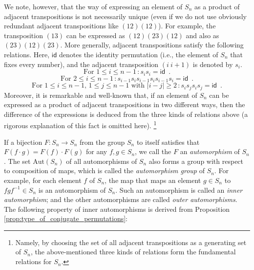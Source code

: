 \documentclass[11pt]{article}
\begin{document}
We note, however, that the way of expressing an element of $S_n$ as a product of adjacent transpositions is not necessarily unique (even if we do not use obviously redundant adjacent transpositions like $(12)(12)$).
For example, the transposition $(13)$ can be expressed as $(12)(23)(12)$ and also as $(23)(12)(23)$.
More generally, adjacent transpositions satisfy the following relations.
Here, $\mathsf{id}$ denotes the identity permutation (i.e., the element of $S_n$ that fixes every number), and the adjacent transposition $(i\ i+1)$ is denoted by $s_i$.
\begin{equation}
\label{eq:relation_each_generator}
\mbox{For } 1 \leq i \leq n-1\,: s_i s_i = \mathsf{id} \enspace.
\end{equation}
\begin{equation}
\label{eq:relation_adjacent_generators}
\mbox{For } 2 \leq i \leq n-1\,: s_{i-1} s_i s_{i-1} s_i s_{i-1} s_i = \mathsf{id} \enspace.
\end{equation}
\begin{equation}
\label{eq:relation_non-adjacent_generators}
\mbox{For } 1 \leq i \leq n-1,\,1 \leq j \leq n-1 \mbox{ with } |i-j| \geq 2\,: s_i s_j s_i s_j = \mathsf{id} \enspace.
\end{equation}
Moreover, it is remarkable and well-known that, if an element of $S_n$ can be expressed as a product of adjacent transpositions in two different ways, then the difference of the expressions is deduced from the three kinds of relations above (a rigorous explanation of this fact is omitted here).%
\footnote{Namely, by choosing the set of all adjacent transpositions as a generating set of $S_n$, the above-mentioned three kinds of relations form the fundamental relations for $S_n$.}

If a bijection $F \colon S_n \to S_n$ from the group $S_n$ to itself satisfies that $F(f \cdot g) = F(f) \cdot F(g)$ for any $f,g \in S_n$, we call the $F$ an \emph{automorphism} of $S_n$.
The set $\mathrm{Aut}(S_n)$ of all automorphisms of $S_n$ also forms a group with respect to composition of maps, which is called the \emph{automorphism group} of $S_n$.
For example, for each element $f$ of $S_n$, the map that maps an element $g \in S_n$ to $f g f^{-1} \in S_n$ is an automorphism of $S_n$.
Such an automorphism is called an \emph{inner automorphism}; and the other automorphisms are called \emph{outer automorphisms}.
The following property of inner automorphisms is derived from Proposition \ref{prop:type_of_conjugate_permutations}:
\end{document}
